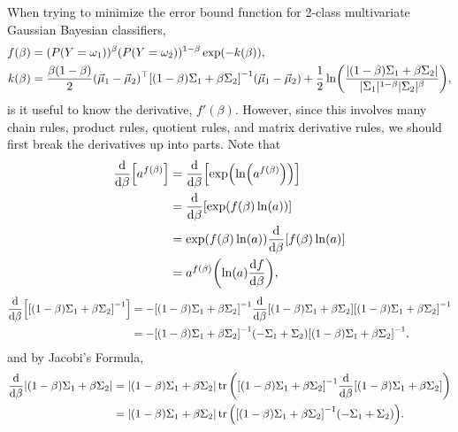 \documentclass[headings=optiontoheadandtoc,listof=totoc,parskip=full]{scrartcl}
\begin{document}
When trying to minimize the error bound function for 2-class multivariate Gaussian Bayesian classifiers,
\begin{equation}
	\begin{split}
		f(\beta) &= (P(Y = \omega_1))^\beta(P(Y = \omega_2))^{1 - \beta}\exp(-k(\beta)),\\
		k(\beta) &= \frac{\beta(1 - \beta)}{2}(\vec\mu_1 - \vec\mu_2)^\top \qty[(1 - \beta)\Sigma_1 + \beta\Sigma_2]^{-1}(\vec\mu_1 - \vec\mu_2) + \frac{1}{2}\ln(\frac{|(1 - \beta)\Sigma_1 + \beta\Sigma_2|}{|\Sigma_1|^{1 - \beta}|\Sigma_2|^\beta}),
	\end{split}
	\label{eq:error-bound-func}
\end{equation}
is it useful to know the derivative, $f'(\beta)$. However, since this involves many chain rules, product rules, quotient rules, and matrix derivative rules, we should first break the derivatives up into parts. Note that
\begin{equation}
	\begin{split}
		\dv{\beta}\qty[a^{f(\beta)}] &= \dv{\beta}\qty[\exp(\ln(a^{f(\beta)}))]\\
			&= \dv{\beta}\qty[\exp(f(\beta)\ln(a))]\\
			&= \exp(f(\beta)\ln(a)) \dv{\beta}\qty[f(\beta)\ln(a)]\\
			&= a^{f(\beta)} \qty(\ln(a) \dv{f}{\beta}), \label{eq:diff-exp}
	\end{split}
\end{equation}
\begin{equation}
	\begin{split}
		\dv{\beta}\qty[\qty[(1 - \beta)\Sigma_1 + \beta\Sigma_2]^{-1}] &= - \qty[(1 - \beta)\Sigma_1 + \beta\Sigma_2]^{-1} \dv{\beta}\qty[(1 - \beta)\Sigma_1 + \beta\Sigma_2] \qty[(1 - \beta)\Sigma_1 + \beta\Sigma_2]^{-1}\\
			&= - \qty[(1 - \beta)\Sigma_1 + \beta\Sigma_2]^{-1} \qty(-\Sigma_1 + \Sigma_2) \qty[(1 - \beta)\Sigma_1 + \beta\Sigma_2]^{-1},\label{eq:diff-inverse}
	\end{split}
\end{equation}
and by Jacobi's Formula,
\begin{equation}
	\begin{split}
		\dv{\beta} |(1 - \beta)\Sigma_1 + \beta\Sigma_2| &= |(1 - \beta)\Sigma_1 + \beta\Sigma_2| \tr \qty(\qty[(1 - \beta)\Sigma_1 + \beta\Sigma_2]^{-1} \dv{\beta} \qty[(1 - \beta)\Sigma_1 + \beta\Sigma_2])\\
			&= |(1 - \beta)\Sigma_1 + \beta\Sigma_2| \tr \qty(\qty[(1 - \beta)\Sigma_1 + \beta\Sigma_2]^{-1} \qty(-\Sigma_1 + \Sigma_2)). \label{eq:diff-det}
	\end{split}
\end{equation}
\end{document}
